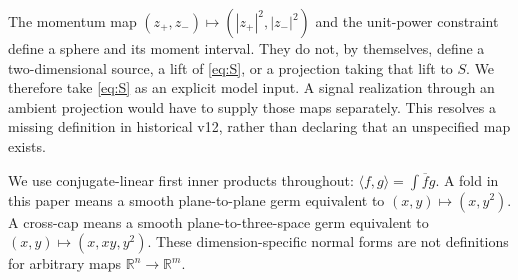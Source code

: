 \documentclass[11pt]{article}
\theoremstyle{readable}
\theoremstyle{remark}\newtheorem{remark}[theorem]{Remark}
\newcommand{\R}{\mathbb R}\newcommand{\C}{\mathbb C}\newcommand{\Z}{\mathbb Z}
\begin{document}
The momentum map $(z_+,z_-)\mapsto(|z_+|^2,|z_-|^2)$ and the unit-power
constraint define a sphere and its moment interval. They do not, by themselves,
define a two-dimensional source, a lift of \eqref{eq:S}, or a projection taking
that lift to $S$. We therefore take \eqref{eq:S} as an explicit model input.
A signal realization through an ambient projection would have to supply those
maps separately. This resolves a missing definition in historical v12,
rather than declaring that an unspecified map exists.

We use conjugate-linear first inner products throughout:
$\langle f,g\rangle=\int\overline f g$. A fold in this paper means a smooth
plane-to-plane germ equivalent to $(x,y)\mapsto(x,y^2)$. A cross-cap means a
smooth plane-to-three-space germ equivalent to $(x,y)\mapsto(x,xy,y^2)$.
These dimension-specific normal forms are not definitions for arbitrary maps
$\R^n\to\R^m$.
\end{document}
